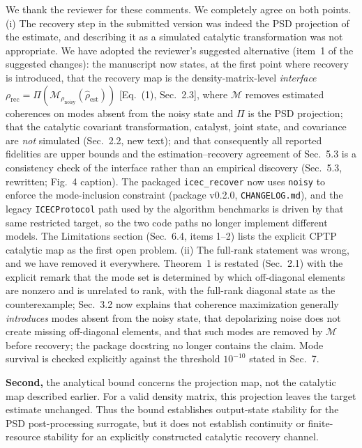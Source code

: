 \documentclass[11pt,a4paper]{article}
\newcommand{\rev}[1]{{\color{black}#1}}
\newcommand{\resp}[1]{{\color{red}#1}}
\begin{document}
\resp{We thank the reviewer for these comments. We completely agree on both points.
(i) The recovery step in the submitted version was indeed the PSD projection of the estimate, and describing it as a simulated catalytic transformation was not appropriate. We have adopted the reviewer's suggested alternative (item~1 of the suggested changes): the manuscript now states, at the first point where recovery is introduced, that the recovery map is the density-matrix-level \emph{interface}
$\rho_\mathrm{rec} = \Pi(\mathcal{M}_{\rho_\mathrm{noisy}}(\hat\rho_\mathrm{est}))$ [Eq.~(1), Sec.~2.3], where $\mathcal{M}$ removes estimated coherences on modes absent from the noisy state and $\Pi$ is the PSD projection; that the catalytic covariant transformation, catalyst, joint state, and covariance are \emph{not} simulated (Sec.~2.2, new text); and that consequently all reported fidelities are upper bounds and the estimation--recovery agreement of Sec.~5.3 is a consistency check of the interface rather than an empirical discovery (Sec.~5.3, rewritten; Fig.~4 caption). The packaged \texttt{icec\_recover} now uses \texttt{noisy} to enforce the mode-inclusion constraint (package v0.2.0, \texttt{CHANGELOG.md}), and the legacy \texttt{ICECProtocol} path used by the algorithm benchmarks is driven by that same restricted target, so the two code paths no longer implement different models. The Limitations section (Sec.~6.4, items 1--2) lists the explicit CPTP catalytic map as the first open problem.
(ii) The full-rank statement was wrong, and we have removed it everywhere. Theorem~1 is restated (Sec.~2.1) with the explicit remark that the mode set is determined by which off-diagonal elements are nonzero and is unrelated to rank, with the full-rank diagonal state as the counterexample; Sec.~3.2 now explains that coherence maximization generally \emph{introduces} modes absent from the noisy state, that depolarizing noise does not create missing off-diagonal elements, and that such modes are removed by $\mathcal{M}$ before recovery; the package docstring no longer contains the claim. Mode survival is checked explicitly against the threshold $10^{-10}$ stated in Sec.~7.}

\rev{\textbf{Second,} the analytical bound concerns the projection map, not the catalytic map described earlier. For a valid density matrix, this projection leaves the target estimate unchanged. Thus the bound establishes output-state stability for the PSD post-processing surrogate, but it does not establish continuity or finite-resource stability for an explicitly constructed catalytic recovery channel.}
\end{document}
